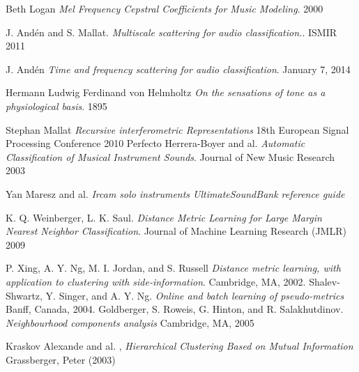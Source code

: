 \documentclass[hidelinks,12pt]{report}
\begin{document}
\newpage
\begin{thebibliography}{2}
Beth Logan
\textit{Mel Frequency Cepstral Coefficients for Music Modeling}. 
2000

J. Andén and S. Mallat. 
\textit{Multiscale scattering for audio classification.}. 
ISMIR 2011

J. Andén 
\textit{Time and frequency scattering for audio classification}. 
January 7, 2014

Hermann Ludwig Ferdinand von Helmholtz
\textit{On the sensations of tone as a physiological basis}.
1895

Stephan Mallat 
\textit{Recursive interferometric Representations}  18th European Signal Processing Conference 2010
Perfecto Herrera-Boyer and al.
\textit{Automatic Classification of Musical Instrument Sounds}.
Journal of New Music Research 2003


Yan Maresz and al.
\textit{Ircam solo instruments UltimateSoundBank reference guide}

K. Q. Weinberger, L. K. Saul. 
\textit{Distance Metric Learning for Large Margin Nearest Neighbor Classification}.
Journal of Machine Learning Research (JMLR) 2009

P. Xing, A. Y. Ng, M. I. Jordan, and S. Russell 
\textit{Distance metric learning, with application to
clustering with side-information}.
 Cambridge, MA, 2002.
 Shalev-Shwartz, Y. Singer, and A. Y. Ng.
 \textit{Online and batch learning of pseudo-metrics}
 Banff, Canada, 2004.
 Goldberger, S. Roweis, G. Hinton, and R. Salakhutdinov.
 \textit{Neighbourhood components analysis}
 Cambridge, MA, 2005
 
  Kraskov Alexande and al. ,
  \textit{Hierarchical Clustering Based on Mutual Information}
  Grassberger, Peter (2003)
\end{thebibliography}
\end{document}
